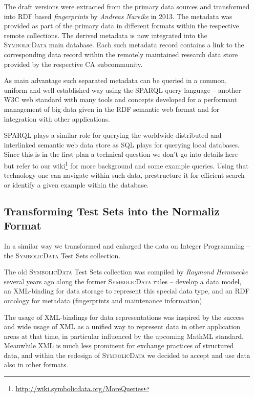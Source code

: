 \documentclass[a4paper,11pt]{article}
\def\SD{\textsc{SymbolicData}}
\begin{document}
The draft versions were extracted from the primary data sources and transformed
into RDF based \emph{fingerprints} by \emph{Andreas Nareike} in 2013.  The
metadata was provided as part of the primary data in different formats within
the respective remote collections. The derived metadata is now integrated into
the {\SD} main database. Each such metadata record contains a link to the
corresponding data record within the remotely maintained research data store
provided by the respective CA subcommunity.

As main advantage such separated metadata can be queried in a common, uniform
and well established way using the SPARQL query language -- another W3C web
standard with many tools and concepts developed for a performant management of
big data given in the RDF semantic web format and for integration with other
applications. 

SPARQL plays a similar role for querying the worldwide distributed and
interlinked semantic web data store as SQL plays for querying local databases.
Since this is in the first plan a technical question we don't go into details
here but refer to our wiki\footnote{
  \url{http://wiki.symbolicdata.org/MoreQueries}} for more background and some
example queries.  Using that technology one can navigate within such data,
prestructure it for efficient search or identify a given example within the
database.

\subsection{Transforming Test Sets into the Normaliz Format}

In a similar way we transformed and enlarged the data on Integer Programming --
the {\SD} Test Sets collection. 

The old {\SD} Test Sets collection was compiled by \emph{Raymond Hemmecke}
several years ago along the former {\SD} rules -- develop a data model, an
XML-binding for data storage to represent this special data type, and an RDF
ontology for metadata (fingerprints and maintenance information).

The usage of XML-bindings for data representations was inspired by the success
and wide usage of XML as a unified way to represent data in other application
areas at that time, in particular influenced by the upcoming MathML standard.
Meanwhile XML is much less prominent for exchange practices of structured data,
and within the redesign of {\SD} we decided to accept and use data also in
other formats. 
\end{document}
